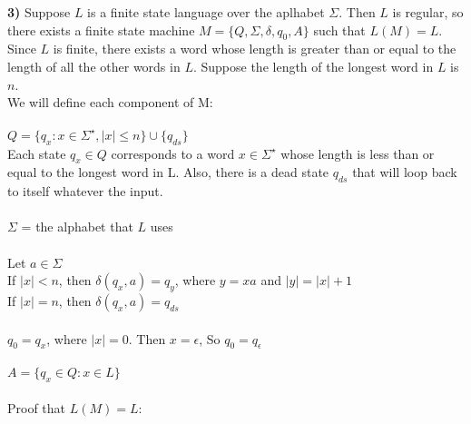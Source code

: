 \documentclass{article}
\begin{document}
\textbf{3)} Suppose $L$ is a finite state language over the aplhabet $\Sigma$. Then $L$ is regular, so there exists a finite state machine $M = \{Q, \Sigma, \delta, q_0, A \}$ such that $L(M) = L$. Since $L$ is finite, there exists a word whose length is greater than or equal to the length of all the other words in $L$. Suppose the length of the longest word in $L$ is $n$.\\ 
We will define each component of M:\\ \\
$Q = \{q_x: x \in \Sigma^\star, |x| \le n \} \cup \{q_{ds}\} $ \\
Each state $q_x \in Q$ corresponds to a word $x \in \Sigma^\star$ whose length is less than or equal to the longest word in L. Also, there is a dead state $q_{ds}$ that will loop back to itself whatever the input.\\ \\
$\Sigma$ = the alphabet that $L$ uses\\ \\
Let $a \in \Sigma$\\
If $|x| < n$, then $\delta(q_x, a) = q_y$, where $y = xa$ and $|y| = |x| + 1$\\
If $|x| = n$, then $\delta(q_x, a) = q_{ds}$\\ \\
$q_0 = q_x$, where $|x| = 0$. Then $x = \epsilon$, So $q_0 = q_{\epsilon}$\\ \\
$A = \{q_x \in Q: x \in L\}$\\ \\
Proof that $L(M) = L$:\\
\end{document}
